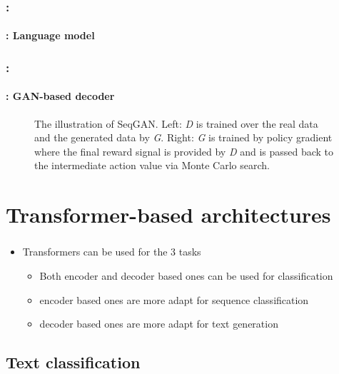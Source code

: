 \documentclass[xcolor=table]{beamer}
\begin{document}
\begin{frame}
	\frametitle{\insertshortsubtitle: \insertsection}
	\framesubtitle{\insertsubsection: Language model}
	
	
\end{frame}

\begin{frame}
	\frametitle{\insertshortsubtitle: \insertsection}
	\framesubtitle{\insertsubsection: GAN-based decoder}
	
	\begin{figure}
		\caption{The illustration of SeqGAN. 
			Left: \textit{D} is trained over the real data and the generated data by \textit{G}. 
			Right: \textit{G} is trained by policy gradient where the final reward signal is provided
			by \textit{D} and is passed back to the intermediate action value via Monte Carlo search. \cite{SeqGAN}}
	\end{figure}
	
\end{frame}


\section{Transformer-based architectures}

\begin{frame}
	\frametitle{\insertshortsubtitle}
	\framesubtitle{\insertsection}
	
	\begin{itemize}
		\item Transformers can be used for the 3 tasks
		\begin{itemize}
			\item Both encoder and decoder based ones can be used for classification
			\item encoder based ones are more adapt for sequence classification
			\item decoder based ones are more adapt for text generation
		\end{itemize}
	\end{itemize}
	
\end{frame}


\subsection{Text classification}
\end{document}
